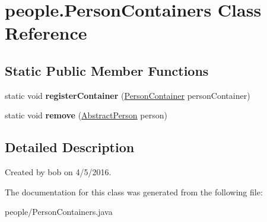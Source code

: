 \hypertarget{classpeople_1_1_person_containers}{}\section{people.\+Person\+Containers Class Reference}
\label{classpeople_1_1_person_containers}
\subsection*{Static Public Member Functions}
\begin{DoxyCompactItemize}
\item 
static void {\bfseries register\+Container} (\hyperlink{interfacepeople_1_1_person_container}{Person\+Container} person\+Container)\hypertarget{classpeople_1_1_person_containers_afdfa1c1ed4df663d0ec5178cb9e9e288}{}\label{classpeople_1_1_person_containers_afdfa1c1ed4df663d0ec5178cb9e9e288}

\item 
static void {\bfseries remove} (\hyperlink{classpeople_1_1_abstract_person}{Abstract\+Person} person)\hypertarget{classpeople_1_1_person_containers_a58f59e75419c8789f08090f24a53fbb9}{}\label{classpeople_1_1_person_containers_a58f59e75419c8789f08090f24a53fbb9}

\end{DoxyCompactItemize}


\subsection{Detailed Description}
Created by bob on 4/5/2016. 

The documentation for this class was generated from the following file\+:\begin{DoxyCompactItemize}
\item 
people/Person\+Containers.\+java\end{DoxyCompactItemize}
